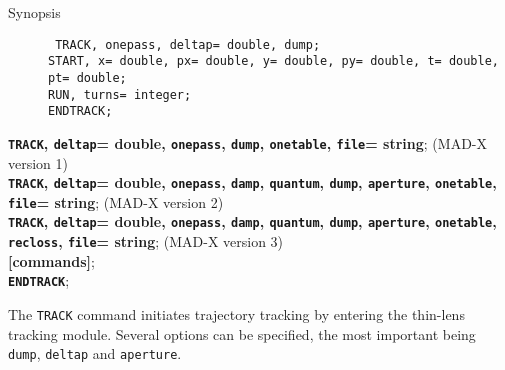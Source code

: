 \begin{description}
	\item[Synopsis] 
\texttt{
         TRACK, onepass, deltap= double, dump; 
\\
         START, x= double, px= double, y= double, py= double, t= double, pt= double; 
\\
         RUN, turns= integer;
\\
         ENDTRACK;
       }
\end{description}
\begin{description}
	\item[Commands]
	\item{\textbf{\texttt{TRACK}, \texttt{deltap}= double, \texttt{onepass}, \texttt{dump}, \texttt{onetable}, \texttt{file}= string}; (MAD-X version 1)
\\\textbf{\texttt{TRACK}, \texttt{deltap}= double, \texttt{onepass}, \texttt{damp}, \texttt{quantum}, \texttt{dump}, \texttt{aperture}, \texttt{onetable}, \texttt{file}= string}; (MAD-X version 2)
\\\textbf{\texttt{TRACK}, \texttt{deltap}= double, \texttt{onepass}, \texttt{damp}, \texttt{quantum}, \texttt{dump}, \texttt{aperture}, \texttt{onetable}, \texttt{recloss}, \texttt{file}= string}; (MAD-X version 3)
\\\textbf{[commands]};
\\\textbf{\texttt{ENDTRACK}}}; 

	\item[Description] 

          The \texttt{TRACK} command initiates trajectory tracking by entering the 
          thin-lens tracking module. Several options can be specified, the most 
          important being \texttt{dump}, \texttt{deltap} and
          \texttt{aperture}. 
          


\end{description}
